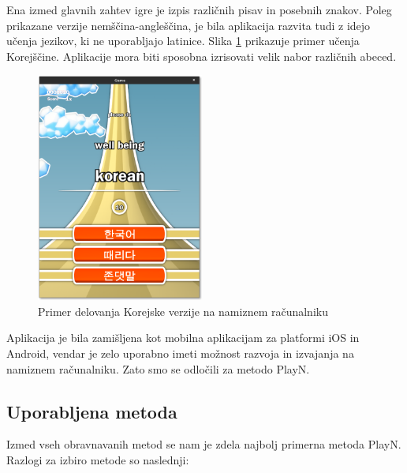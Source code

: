 Ena izmed glavnih zahtev igre je izpis različnih pisav in posebnih znakov. Poleg prikazane verzije nemščina-angleščina, je bila aplikacija razvita tudi z idejo učenja jezikov, ki ne uporabljajo latinice. Slika \ref{korean} prikazuje primer učenja Korejščine. Aplikacije mora biti sposobna izrisovati velik nabor različnih abeced.

\begin{figure}
\begin{center}
\includegraphics[width=5.5cm]{pic/defg-korean.png}
\end{center}
\caption{Primer delovanja Korejske verzije na namiznem računalniku}
\label{korean}
\end{figure} 

Aplikacija je bila zamišljena kot mobilna aplikacijam za platformi iOS in Android, vendar je zelo uporabno imeti možnost razvoja in izvajanja na namiznem računalniku. Zato smo se odločili za metodo PlayN.

\subsection{Uporabljena metoda}

Izmed vseh obravnavanih metod se nam je zdela najbolj primerna metoda PlayN. Razlogi za izbiro metode so naslednji:

